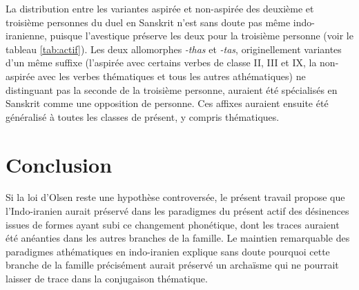 \documentclass[oldfontcommands,oneside,a4paper,11pt]{article}
\newcommand{\ipa}[1]{{\phon\textit{#1}}} %
\begin{document}
La distribution entre les variantes aspirée et non-aspirée des deuxième et troisième personnes du duel en Sanskrit  n'est sans doute pas même indo-iranienne, puisque l'avestique préserve les deux pour la troisième personne (voir le tableau \ref{tab:actif}). Les deux allomorphes \ipa{-thas} et \ipa{-tas}, originellement variantes d'un même suffixe (l'aspirée avec certains verbes de classe II, III et IX, la non-aspirée avec les verbes thématiques et tous les autres athématiques) ne distinguant pas la seconde de la troisième personne, auraient été spécialisés en Sanskrit comme une opposition de personne. Ces affixes auraient ensuite été généralisé à toutes les classes de présent, y compris thématiques.

\section*{Conclusion}
Si la loi d'Olsen reste une hypothèse controversée, le présent travail propose que l'Indo-iranien aurait préservé dans les paradigmes du présent actif des désinences issues de formes ayant subi ce changement phonétique, dont les traces auraient été anéanties dans les autres branches de la famille. Le maintien remarquable des paradigmes athématiques en indo-iranien explique sans doute pourquoi cette branche de la famille précisément aurait préservé un archaïsme qui ne pourrait laisser de trace dans la conjugaison thématique. 



\end{document}
